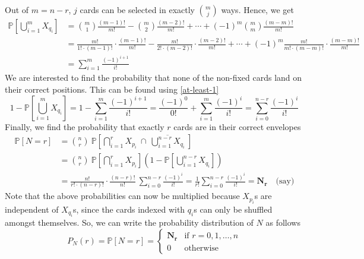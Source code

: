 \documentclass[9pt]{article}
\begin{document}
Out of $m = n-r$, $j$ cards can be selected in exactly ${{m}\choose{j}}$ ways. Hence, we get
\begin{equation}
    \label{at-least-1}
    \begin{split}
        \mathbb{P}\left[ \bigcup_{i=1}^{m} X_{q_{i}} \right] &= {{m}\choose{1}} \frac{(m-1)!}{m!} - {{m}\choose{2}} \frac{(m-2)!}{m!} + \cdots + (-1)^{m} {{m}\choose{m}} \frac{(m-m)!}{m!} \\
        &= \frac{m!}{1! \cdot (m-1)!} \cdot \frac{(m-1)!}{m!} - \frac{m!}{2! \cdot (m-2)!} \cdot \frac{(m-2)!}{m!} + \cdots + (-1)^{m} \frac{m!}{m! \cdot (m-m)!} \cdot \frac{(m-m)!}{m!} \\
        &= \sum_{i=1}^{m} \frac{(-1)^{i+1}}{i!}
    \end{split}
\end{equation}
We are interested to find the probability that none of the non-fixed cards land on their correct positions. This can be
found using \eqref{at-least-1}
\begin{equation}
    1 - \mathbb{P}\left[ \bigcup_{i=1}^{m} X_{q_{i}} \right] = 1 - \sum_{i=1}^{m} \frac{(-1)^{i+1}}{i!} = \frac{(-1)^{0}}{0!} + \sum_{i=1}^{m} \frac{(-1)^{i}}{i!} = \sum_{i=0}^{n-r} \frac{(-1)^{i}}{i!}
\end{equation}
Finally, we find the probability that exactly $r$ cards are in their correct envelopes
\begin{equation}
    \label{N-equals-r}
    \begin{split}
        \mathbb{P}[N = r] &= {{n}\choose{r}} \ \mathbb{P}\left[ \bigcap_{i=1}^{r} X_{p_{i}} \ \cap \ \overline{\bigcup_{i=1}^{n-r} X_{q_{i}}} \ \right] \\
        &= {{n}\choose{r}} \ \mathbb{P}\left[ \bigcap_{i=1}^{r} X_{p_{i}} \right] \left( 1 - \mathbb{P}\left[ \bigcup_{i=1}^{n-r} X_{q_{i}} \right] \right) \\
        &= \frac{n!}{r! \cdot (n-r)!} \cdot \frac{(n-r)!}{n!} \ \sum_{i=0}^{n-r} \frac{(-1)^{i}}{i!} = \frac{1}{r!} \sum_{i=0}^{n-r} \frac{(-1)^{i}}{i!} = \mathbf{N_{r}} \quad \text{(say)}
    \end{split}
\end{equation}
Note that the above probabilities can now be multiplied because $X_{p_{i}}$s are independent of $X_{q_{i}}$s,
since the cards indexed with $q_{i}$s can only be shuffled amongst themselves. So, we can write the probability
distribution of $N$ as follows
\begin{equation}
    \label{PMF-N}
    P_{N}(r) = \mathbb{P}[N = r] = \begin{cases}
        \mathbf{N_{r}} & \text{if } r = 0, 1, \dots, n \\
        0 & \text{otherwise}
    \end{cases}
\end{equation}
\end{document}
